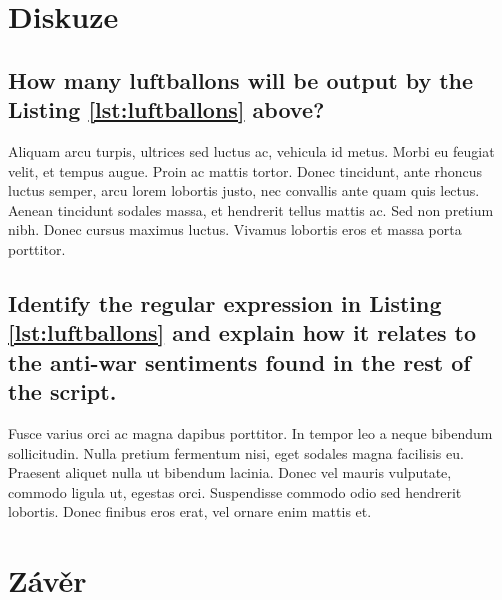 \documentclass[11pt]{scrartcl} %
\begin{document}

\section{Diskuze}




\subsection{How many luftballons will be output by the Listing \ref{lst:luftballons} above?}

Aliquam arcu turpis, ultrices sed luctus ac, vehicula id metus. Morbi eu feugiat velit, et tempus augue. Proin ac mattis tortor. Donec tincidunt, ante rhoncus luctus semper, arcu lorem lobortis justo, nec convallis ante quam quis lectus. Aenean tincidunt sodales massa, et hendrerit tellus mattis ac. Sed non pretium nibh. Donec cursus maximus luctus. Vivamus lobortis eros et massa porta porttitor.


\subsection{Identify the regular expression in Listing \ref{lst:luftballons} and explain how it relates to the anti-war sentiments found in the rest of the script.}

Fusce varius orci ac magna dapibus porttitor. In tempor leo a neque bibendum sollicitudin. Nulla pretium fermentum nisi, eget sodales magna facilisis eu. Praesent aliquet nulla ut bibendum lacinia. Donec vel mauris vulputate, commodo ligula ut, egestas orci. Suspendisse commodo odio sed hendrerit lobortis. Donec finibus eros erat, vel ornare enim mattis et.


\section{Závěr}
\end{document}
